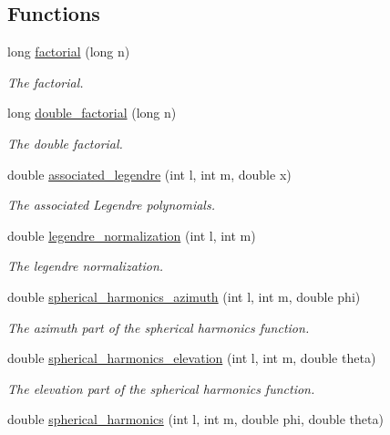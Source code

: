 \subsection*{Functions}
\begin{DoxyCompactItemize}
\item 
long \hyperlink{namespace_hoa3_d_a1ed1e9803ad96127f1054b1a473b425d}{factorial} (long n)
\begin{DoxyCompactList}\small\item\em The factorial. \end{DoxyCompactList}\item 
long \hyperlink{namespace_hoa3_d_a1414c728d02e9d3d60035e385d2150ec}{double\-\_\-factorial} (long n)
\begin{DoxyCompactList}\small\item\em The double factorial. \end{DoxyCompactList}\item 
double \hyperlink{namespace_hoa3_d_af20cfa7da792b7bb0b6f98eccb371ca8}{associated\-\_\-legendre} (int l, int m, double x)
\begin{DoxyCompactList}\small\item\em The associated Legendre polynomials. \end{DoxyCompactList}\item 
double \hyperlink{namespace_hoa3_d_a771a662a201e9922fd8084dafb507a20}{legendre\-\_\-normalization} (int l, int m)
\begin{DoxyCompactList}\small\item\em The legendre normalization. \end{DoxyCompactList}\item 
double \hyperlink{namespace_hoa3_d_a03f884a043a03a2a70cd3cdf46eaa7a5}{spherical\-\_\-harmonics\-\_\-azimuth} (int l, int m, double phi)
\begin{DoxyCompactList}\small\item\em The azimuth part of the spherical harmonics function. \end{DoxyCompactList}\item 
double \hyperlink{namespace_hoa3_d_a36da69477764cc43e96106d7436d0797}{spherical\-\_\-harmonics\-\_\-elevation} (int l, int m, double theta)
\begin{DoxyCompactList}\small\item\em The elevation part of the spherical harmonics function. \end{DoxyCompactList}\item 
double \hyperlink{namespace_hoa3_d_a5c89b100a0887912882451b15d3c69b9}{spherical\-\_\-harmonics} (int l, int m, double phi, double theta)

\end{DoxyCompactItemize}
